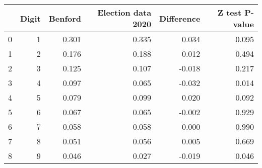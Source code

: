 \begin{tabular}{lrrrrr}
\toprule
{} &  Digit &  Benford &  Election data 2020 &  Difference &  Z test P-value \\
\midrule
0 &      1 &    0.301 &               0.335 &       0.034 &           0.095 \\
1 &      2 &    0.176 &               0.188 &       0.012 &           0.494 \\
2 &      3 &    0.125 &               0.107 &      -0.018 &           0.217 \\
3 &      4 &    0.097 &               0.065 &      -0.032 &           0.014 \\
4 &      5 &    0.079 &               0.099 &       0.020 &           0.092 \\
5 &      6 &    0.067 &               0.065 &      -0.002 &           0.929 \\
6 &      7 &    0.058 &               0.058 &       0.000 &           0.990 \\
7 &      8 &    0.051 &               0.056 &       0.005 &           0.669 \\
8 &      9 &    0.046 &               0.027 &      -0.019 &           0.046 \\
\bottomrule
\end{tabular}
